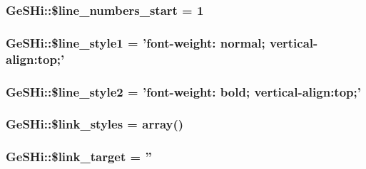 \hypertarget{class_ge_s_hi_a56b53d542d0bcd35655210f76a1fd924}{
\subsubsection[{\$line\-\_\-numbers\-\_\-start}]{\setlength{\rightskip}{0pt plus 5cm}Ge\-S\-Hi\-::\$line\-\_\-numbers\-\_\-start = 1}}\label{class_ge_s_hi_a56b53d542d0bcd35655210f76a1fd924}
\hypertarget{class_ge_s_hi_a149eb8b3e7520eb66c5286c73526e164}{
\subsubsection[{\$line\-\_\-style1}]{\setlength{\rightskip}{0pt plus 5cm}Ge\-S\-Hi\-::\$line\-\_\-style1 = 'font-\/weight\-: normal; vertical-\/align\-:top;'}}\label{class_ge_s_hi_a149eb8b3e7520eb66c5286c73526e164}
\hypertarget{class_ge_s_hi_a66a40a6cfd46f84c5575aea3cc15144d}{
\subsubsection[{\$line\-\_\-style2}]{\setlength{\rightskip}{0pt plus 5cm}Ge\-S\-Hi\-::\$line\-\_\-style2 = 'font-\/weight\-: bold; vertical-\/align\-:top;'}}\label{class_ge_s_hi_a66a40a6cfd46f84c5575aea3cc15144d}
\hypertarget{class_ge_s_hi_aec1e360701e87c41339671b3a87382d0}{
\subsubsection[{\$link\-\_\-styles}]{\setlength{\rightskip}{0pt plus 5cm}Ge\-S\-Hi\-::\$link\-\_\-styles = array()}}\label{class_ge_s_hi_aec1e360701e87c41339671b3a87382d0}
\hypertarget{class_ge_s_hi_a0c8794649f21000514d6e13929138ca3}{
\subsubsection[{\$link\-\_\-target}]{\setlength{\rightskip}{0pt plus 5cm}Ge\-S\-Hi\-::\$link\-\_\-target = ''}}\label{class_ge_s_hi_a0c8794649f21000514d6e13929138ca3}
